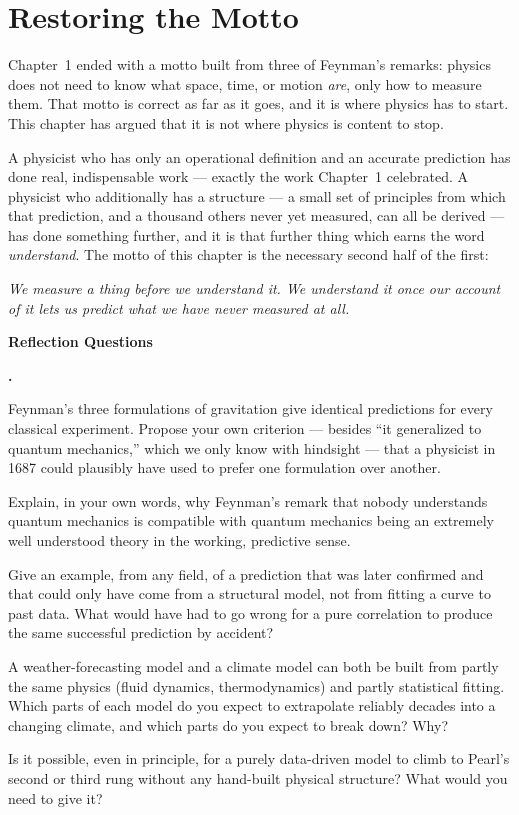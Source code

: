 \documentclass[12pt]{book}
\newcounter{reflectq}
\newenvironment{reflectquestions}
  {\begin{list}{\textbf{\arabic{reflectq}.}}
    {\usecounter{reflectq}\setlength{\leftmargin}{1.6em}\setlength{\itemsep}{6pt}}}
  {\end{list}}
\begin{document}
\section{Restoring the Motto}
\label{sec:restoring}

Chapter~1 ended with a motto built from three of Feynman's remarks: physics does not need to know what space, time, or motion \emph{are}, only how to measure them. That motto is correct as far as it goes, and it is where physics has to start. This chapter has argued that it is not where physics is content to stop.

A physicist who has only an operational definition and an accurate prediction has done real, indispensable work --- exactly the work Chapter~1 celebrated. A physicist who additionally has a structure --- a small set of principles from which that prediction, and a thousand others never yet measured, can all be derived --- has done something further, and it is that further thing which earns the word \emph{understand}. The motto of this chapter is the necessary second half of the first:

\begin{mdframed}[backgroundcolor=gray!8, linecolor=gray!40, linewidth=0.6pt, roundcorner=3pt]
\centering
\textit{We measure a thing before we understand it. We understand it once our account of it lets us predict what we have never measured at all.}
\end{mdframed}

\bigskip
\noindent\textbf{Reflection Questions}
\begin{reflectquestions}
\item Feynman's three formulations of gravitation give identical predictions for every classical experiment. Propose your own criterion --- besides ``it generalized to quantum mechanics,'' which we only know with hindsight --- that a physicist in 1687 could plausibly have used to prefer one formulation over another.
\item Explain, in your own words, why Feynman's remark that nobody understands quantum mechanics is compatible with quantum mechanics being an extremely well understood theory in the working, predictive sense.
\item Give an example, from any field, of a prediction that was later confirmed and that could only have come from a structural model, not from fitting a curve to past data. What would have had to go wrong for a pure correlation to produce the same successful prediction by accident?
\item A weather-forecasting model and a climate model can both be built from partly the same physics (fluid dynamics, thermodynamics) and partly statistical fitting. Which parts of each model do you expect to extrapolate reliably decades into a changing climate, and which parts do you expect to break down? Why?
\item Is it possible, even in principle, for a purely data-driven model to climb to Pearl's second or third rung without any hand-built physical structure? What would you need to give it?
\end{reflectquestions}
\end{document}
